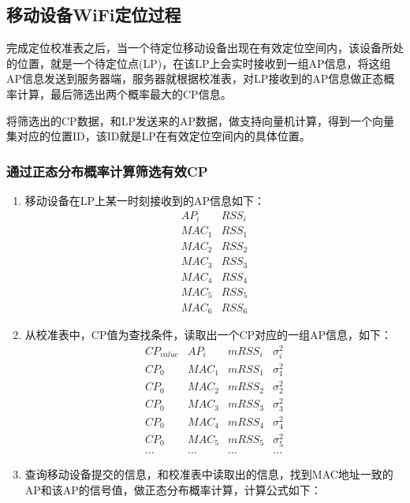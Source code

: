 \documentclass[UTF8, twocolumn ]{ctexart}
\begin{document}
\subsection{移动设备WiFi定位过程}
完成定位校准表之后，当一个待定位移动设备出现在有效定位空间内，该设备所处的位置，就是一个待定位点(LP)，在该LP上会实时接收到一组AP信息，将这组AP信息发送到服务器端，服务器就根据校准表，对LP接收到的AP信息做正态概率计算，最后筛选出两个概率最大的CP信息。
\par
将筛选出的CP数据，和LP发送来的AP数据，做支持向量机计算，得到一个向量集对应的位置ID，该ID就是LP在有效定位空间内的具体位置。
\subsubsection{通过正态分布概率计算筛选有效CP}
\begin{enumerate}
\item 移动设备在LP上某一时刻接收到的AP信息如下：
  \begin{equation}
    \begin{array}{c|c}
      AP_{i} & RSS_{i} \\ \hline
      MAC_{1} & RSS_{1} \\
      MAC_{2} & RSS_{2} \\
      MAC_{3} & RSS_{3} \\
      MAC_{4} & RSS_{4} \\
      MAC_{5} & RSS_{5} \\
      MAC_{6} & RSS_{6}
    \end{array}
  \end{equation}
\item 从校准表中，CP值为查找条件，读取出一个CP对应的一组AP信息，如下：
  \begin{equation}
    \begin{array}{c|c|c|c}
      CP_{value} & AP_{i} & mRSS_{i} & \sigma^{2}_{i} \\ \hline
      CP_{0} & MAC_{1} & mRSS_{1} & \sigma^{2}_{1} \\
      CP_{0} & MAC_{2} & mRSS_{2} & \sigma^{2}_{2} \\
      CP_{0} & MAC_{3} & mRSS_{3} & \sigma^{2}_{3} \\
      CP_{0} & MAC_{4} & mRSS_{4} & \sigma^{2}_{4} \\
      CP_{0} & MAC_{5} & mRSS_{5} & \sigma^{2}_{5} \\
      ... & ... & ... & ...
    \end{array}
  \end{equation}
\item 查询移动设备提交的信息，和校准表中读取出的信息，找到MAC地址一致的AP和该AP的信号值，做正态分布概率计算，计算公式如下：

\end{enumerate}
\end{document}
